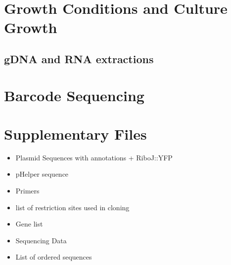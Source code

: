 \section{Growth Conditions and Culture Growth}
\label{sec:culture_growth}


\subsection{gDNA and RNA extractions}
\label{sec:dna_rna_extract}


\section{Barcode Sequencing}
\label{sec:barcode_seq}

\section{Supplementary Files}
\label{sec:SI_files}
\begin{itemize}
    \item Plasmid Sequences with annotations + RiboJ::YFP
    \item pHelper sequence
    \item Primers
    \item list of restriction sites used in cloning
    \item Gene list
    \item Sequencing Data
    \item List of ordered sequences
\end{itemize}